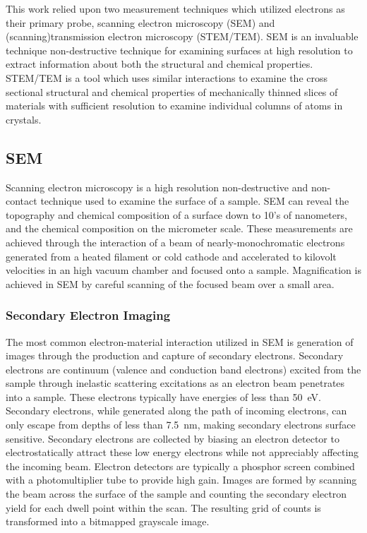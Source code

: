 This work relied upon two measurement techniques which utilized electrons as their primary probe, scanning electron microscopy (SEM) and (scanning)transmission electron microscopy (STEM/TEM).
SEM is an invaluable technique non-destructive technique for examining surfaces at high resolution to extract information about both the structural and chemical properties.
STEM/TEM is a tool which uses similar interactions to examine the cross sectional structural and chemical properties of mechanically thinned slices of materials with sufficient resolution to examine individual columns of atoms in crystals.
\subsection{SEM} Scanning electron microscopy is a high resolution non-destructive and non-contact technique used to examine the surface of a sample.
SEM can reveal the topography and chemical composition of a surface down to 10's of nanometers, and the chemical composition on the micrometer scale.
These measurements are achieved through the interaction of a beam of nearly-monochromatic electrons generated from a heated filament or cold cathode and accelerated to kilovolt velocities in an high vacuum chamber and focused onto a sample.
Magnification is achieved in SEM by careful scanning of the focused beam over a small area.

\subsubsection{Secondary Electron Imaging} The most common electron-material interaction utilized in SEM is generation of images through the production and capture of secondary electrons.
Secondary electrons are continuum (valence and conduction band electrons) excited from the sample through inelastic scattering excitations as an electron beam penetrates into a sample.
These electrons typically have energies of less than 50~eV\cite{goldstein2003scanning}.
Secondary electrons, while generated along the path of incoming electrons, can only escape from depths of less than 7.5~nm, making secondary electrons surface sensitive\cite{goldstein2003scanning}.
Secondary electrons are collected by biasing an electron detector to electrostatically attract these low energy electrons while not appreciably affecting the incoming beam.
Electron detectors are typically a phosphor screen combined with a photomultiplier tube to provide high gain.
Images are formed by scanning the beam across the surface of the sample and counting the secondary electron yield for each dwell point within the scan.
The resulting grid of counts is transformed into a bitmapped grayscale image.

